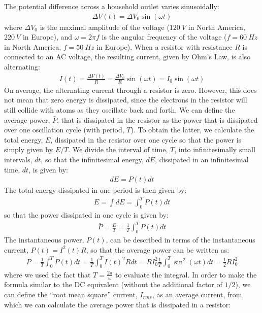The potential difference across a household outlet varies sinusoidally:
\begin{align*}
\Delta V (t) = \Delta V_0 \sin(\omega t)
\end{align*}
where $\Delta V_0$ is the maximal amplitude of the voltage ($\SI{120}{V}$ in North America, $\SI{220}{V}$ in Europe), and $\omega = 2\pi f$ is the angular frequency of the voltage ($f=\SI{60}{Hz}$ in North America, $f=\SI{50}{Hz}$ in Europe). When a resistor with resistance $R$ is connected to an AC voltage, the resulting current, given by Ohm's Law, is also alternating:
\begin{align*}
I(t)=\frac{\Delta V(t)}{R}=\frac{\Delta V_0}{R}\sin(\omega t)=I_0\sin(\omega t)
\end{align*}
On average, the alternating current through a resistor is zero. However, this does not mean that zero  energy is dissipated, since the electrons in the resistor will still collide with atoms as they oscillate back and forth. We can define the average power, $\bar P$, that is dissipated in the resistor as the  power that is dissipated over one oscillation cycle (with period, $T$). To obtain the latter, we calculate the total energy, $E$, dissipated in the resistor over one cycle so that the power is simply given by $E/T$. We divide the interval of time, $T$, into infinitesimally small intervals, $dt$, so that the infinitesimal energy, $dE$, dissipated in an infinitesimal time, $dt$, is given by:
\begin{align*}
dE=P(t) dt
\end{align*}
The total energy dissipated in one period is then given by:
\begin{align*}
E=\int dE = \int_0^T P(t)dt
\end{align*}
so that the power dissipated in one cycle is given by:
\begin{align*}
\bar P=\frac{E}{T}=\frac{1}{T}\int_0^T P(t)dt
\end{align*}
The instantaneous power, $P(t)$, can be described in terms of the instantaneous current, $P(t)=I^2(t)R$, so that the average power can be written as:
\begin{align*}
\bar P = \frac{1}{T}\int_0^TP(t)dt=\frac{1}{T}\int_0^TI(t)^2Rdt=RI_0^2\frac{1}{T}\int_0^T\sin^2(\omega t)dt=\frac{1}{2}RI_0^2
\end{align*}
where we used the fact that $T=\frac{2\pi}{\omega}$ to evaluate the integral. In order to make the formula similar to the DC equivalent (without the additional factor of $1/2$), we can define the ``root mean square'' current, $I_{rms}$, as an average current, from which we can calculate the average power that is dissipated in a resistor:
